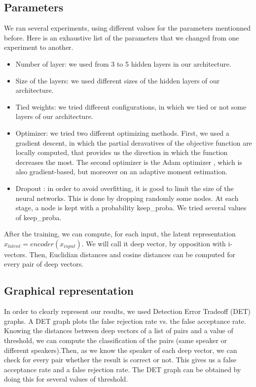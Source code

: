 \documentclass[conference]{IEEEtran}
\begin{document}
\subsection{Parameters}

We ran several experiments, using different values for the parameters mentionned before.
Here is an exhaustive list of the parameters that we changed from one experiment to another.

\begin{itemize}
\item{Number of layer}: we used from 3 to 5 hidden layers in our architecture.
\item{Size of the layers}: we used different sizes of the hidden layers of our architecture.
\item{Tied weights}: we tried different configurations, in which we tied or not some layers of our architecture.
\item{Optimizer}: we tried two different optimizing methods. First, we used a gradient descent, in which the partial deravatives of the objective function are locally computed, that provides us the direction in which the function decreases the most. The second optimizer is the Adam optimizer \cite{DBLP:journals/corr/KingmaB14}, which is also gradient-based, but moreover on an adaptive moment estimation.
\item{Dropout} \cite{Srivastava:2014:DSW:2627435.2670313}: in order to avoid overfitting, it is good to limit the size of the neural networks. This is done by dropping randomly some nodes. At each stage, a node is kept with a probability keep\_proba. We tried several values of keep\_proba.
\end{itemize}

After the training, we can compute, for each input, the latent representation $x_{latent} = encoder(x_{input})$. We will call it deep vector, by opposition with i-vectors. Then, Euclidian distances and cosine distances can be computed for every pair of deep vectors.

\subsection{Graphical representation}

In order to clearly represent our results, we used Detection Error Tradeoff (DET) graphs. A DET graph plots the false rejection rate vs. the false acceptance rate. Knowing the distances between deep vectors of a list of pairs and a value of threshold, we can compute the classification of the pairs (same speaker or different speakers).Then, as we know the speaker of each deep vector, we can check for every pair whether the result is correct or not. This gives us a false acceptance rate and a false rejection rate. The DET graph can be obtained by doing this for several values of threshold.
\end{document}
